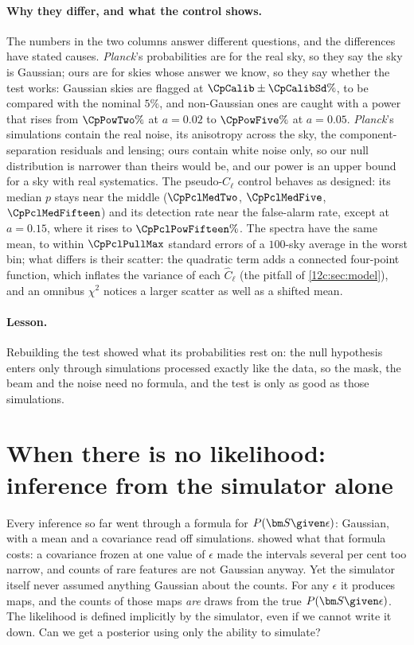 \paragraph{Why they differ, and what the control shows.} The numbers in the two columns answer different questions, and the differences
have stated causes. \textit{Planck}'s probabilities are for the real sky, so they say the sky is Gaussian; ours are for skies whose answer we
know, so they say whether the test works: Gaussian skies are flagged at $\CpCalib\pm\CpCalibSd\%$, to be compared with the nominal
$5\%$, and non-Gaussian ones are caught with a power that rises
from $\CpPowTwo\%$ at $a=0.02$ to $\CpPowFive\%$ at $a=0.05$. \textit{Planck}'s simulations contain the real noise, its anisotropy across the sky,
the component-separation residuals and lensing; ours contain white noise only, so our null distribution is narrower than theirs would be,
and our power is an upper bound for a sky with real systematics. The pseudo-$C_\ell$ control behaves as designed: its median $p$ stays near
the middle ($\CpPclMedTwo$, $\CpPclMedFive$, $\CpPclMedFifteen$) and its detection rate near the false-alarm rate, except at $a=0.15$, where it
rises to $\CpPclPowFifteen\%$. The spectra have the same mean, to within $\CpPclPullMax$ standard errors of a $100$-sky average in the worst bin;
what differs is their scatter: the quadratic term adds a connected four-point function, which inflates the variance of each $\hat C_\ell$ (the
pitfall of \cref{12c:sec:model}), and an omnibus $\chi^2$ notices a larger scatter as well as a shifted mean.

\paragraph{Lesson.} Rebuilding the test showed what its probabilities rest on: the null hypothesis enters only through simulations processed
exactly like the data, so the mask, the beam and the noise need no formula, and the test is only as good as those simulations.
\section{When there is no likelihood: inference from the simulator alone}
\label{12c:sec:abc}

Every inference so far went through a formula for $P(\bm S\given\epsilon)$: Gaussian, with a mean and a covariance read off
simulations.  showed what that formula costs: a covariance frozen at one value of $\epsilon$ made the
intervals several per cent too narrow, and counts of rare features are not Gaussian anyway. Yet the simulator itself never assumed
anything Gaussian about the counts. For any $\epsilon$ it produces maps, and the counts of those maps \emph{are} draws from the true
$P(\bm S\given\epsilon)$. The likelihood is defined implicitly by the simulator, even if we cannot write it down. Can we get a
posterior using only the ability to simulate?

